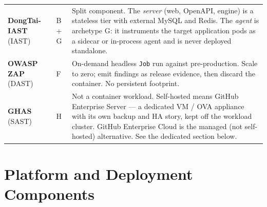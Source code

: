 \documentclass[10pt,letterpaper]{article}
\newcommand{\tool}[1]{\textbf{#1}}
\begin{document}
\begin{longtable}{L{1.15in} C{0.5in} L{4.9in}}
\tool{DongTai-IAST} \newline (IAST) & B + G & Split component. The \emph{server} (web, OpenAPI, engine) is a stateless tier with external MySQL and Redis. The \emph{agent} is archetype G: it instruments the target application pods as a sidecar or in-process agent and is never deployed standalone. \\
\tool{OWASP ZAP} \newline (DAST) & F & On-demand headless \texttt{Job} run against pre-production. Scale to zero; emit findings as release evidence, then discard the container. No persistent footprint. \\
\tool{GHAS} \newline (SAST) & H & Not a container workload. Self-hosted means GitHub Enterprise Server --- a dedicated VM / OVA appliance with its own backup and HA story, kept off the workload cluster. GitHub Enterprise Cloud is the managed (not self-hosted) alternative. See the dedicated section below. \\
\end{longtable}
\normalsize

\section{Platform and Deployment Components}
\end{document}
